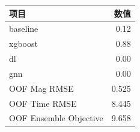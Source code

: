 \begingroup
\footnotesize
\setlength{\tabcolsep}{4pt}
\begin{tabular}{lr}
\toprule
项目 & 数值 \\
\midrule
baseline & 0.12 \\
xgboost & 0.88 \\
dl & 0.00 \\
gnn & 0.00 \\
OOF Mag RMSE & 0.525 \\
OOF Time RMSE & 8.445 \\
OOF Ensemble Objective & 9.658 \\
\bottomrule
\end{tabular}
\endgroup
